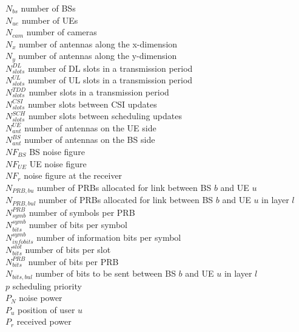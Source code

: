 $N_{bs}$ \mytab number of \acsp{BS} \\
$N_{ue}$ \mytab number of \acsp{UE} \\
$N_{cam}$ \mytab number of cameras \\
$N_x$ \mytab number of antennas along the x-dimension\\
$N_y$ \mytab number of antennas along the y-dimension\\
$N^{DL}_{slots}$ \mytab number of \acs{DL} slots in a transmission period\\
$N^{UL}_{slots}$ \mytab number of \acs{UL} slots in a transmission period\\
$N^{TDD}_{slots}$ \mytab number slots in a transmission period\\
$N^{CSI}_{slots}$ \mytab number slots between \acs{CSI} updates\\
$N^{SCH}_{slots}$ \mytab number slots between scheduling updates\\
$N_{ant}^{UE}$ \mytab number of antennas on the \acs{UE} side\\
$N_{ant}^{BS}$ \mytab number of antennas on the \acs{BS} side\\
$NF_{BS}$ \mytab BS noise figure \\
$NF_{UE}$ \mytab UE noise figure\\
$NF_{r}$ \mytab noise figure at the receiver\\
$N_{PRB, bu}$ \mytab number of PRBs allocated for link between BS $b$ and UE $u$ \\
$N_{PRB, bul}$ \mytab number of PRBs allocated for link between BS $b$ and UE $u$ in layer $l$\\
$N_{symb}^{PRB}$ \mytab number of symbols per PRB \\
$N_{bits}^{symb}$ \mytab number of bits per symbol \\
$N_{info bits}^{symb}$ \mytab number of information bits per symbol \\
$N_{bits}^{slot}$ \mytab number of bits per slot \\
$N_{bits}^{PRB}$ \mytab number of bits per PRB \\
$N_{bits, bul}$ \mytab number of bits to be sent between BS $b$ and UE $u$ in layer $l$\\
$p$ \mytab scheduling priority\\
$P_N$ \mytab noise power \\
$P_u$ \mytab position of user $u$ \\
$P_r$ \mytab received power \\
